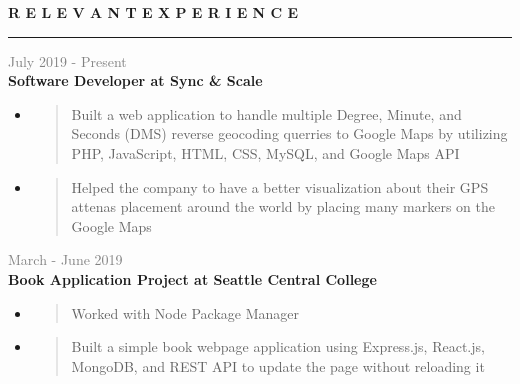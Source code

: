 \documentclass[letterpage]{article}
\begin{document}
\begin{minipage}[t]{0.63\linewidth}
\vspace{0pt}
\textbf{\fontsize{14px}{1px}\selectfont R E L E V A N T \:\:
E X P E R I E N C E}\\
\noindent\rule{4.295in}{0.1pt}

\vspace{7px}
\textcolor{gray}{July 2019 - Present}\\
\textbf{\textsf{Software Developer at Sync \& Scale}}
\begin{itemize}[leftmargin=*,labelindent=1mm,labelsep=0mm]
\renewcommand\labelitemi{\rule[1mm]{0.33mm}{0.33mm}}
\renewcommand\labelitemii{$\blacksquare$}
\item
  \begin{quote}
  \raggedright
  Built a web application to handle 
  multiple Degree, Minute, and Seconds (DMS) 
  reverse geocoding querries to Google Maps by utilizing  
  PHP, JavaScript, HTML, CSS, MySQL, and Google Maps API
  \end{quote}
\item
  \begin{quote}
  \raggedright
  Helped the company to have a better visualization 
  about their GPS attenas placement around the world by 
  placing many markers on the Google Maps
  \end{quote}
\end{itemize}

\vspace{7px}
\textcolor{gray}{March - June 2019}\\
\textbf{\textsf{Book Application Project at Seattle Central College}}
\begin{itemize}[leftmargin=*,labelindent=1mm,labelsep=0mm]
\renewcommand\labelitemi{\rule[1mm]{0.33mm}{0.33mm}}
\renewcommand\labelitemii{$\blacksquare$}
\item
  \begin{quote}
  \raggedright
  Worked with Node Package Manager
  \end{quote}
\item
  \begin{quote}
  \raggedright
  Built a simple book webpage application using Express.js, React.js,
  MongoDB, and REST API to update the page without reloading it
  \end{quote}
\end{itemize}


\end{minipage}
\end{document}
